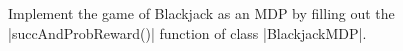 \item {}
Implement the game of Blackjack as an MDP by filling out the
|succAndProbReward()| function of class |BlackjackMDP|.
